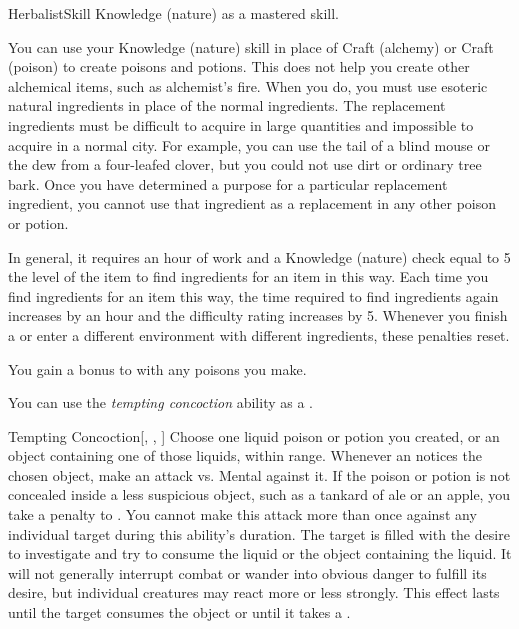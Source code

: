     \begin{feat}{Herbalist}{Skill}
        \featpre Knowledge (nature) as a mastered skill.

         You can use your Knowledge (nature) skill in place of Craft (alchemy) or Craft (poison) to create poisons and potions.
        This does not help you create other alchemical items, such as alchemist's fire.
        When you do, you must use esoteric natural ingredients in place of the normal ingredients.
        The replacement ingredients must be difficult to acquire in large quantities and impossible to acquire in a normal city.
        For example, you can use the tail of a blind mouse or the dew from a four-leafed clover, but you could not use dirt or ordinary tree bark.
        Once you have determined a purpose for a particular replacement ingredient, you cannot use that ingredient as a replacement in any other poison or potion.

        In general, it requires an hour of work and a Knowledge (nature) check equal to 5 \add the level of the item to find ingredients for an item in this way.
        Each time you find ingredients for an item this way, the time required to find ingredients again increases by an hour and the difficulty rating increases by 5.
        Whenever you finish a  or enter a different environment with different ingredients, these penalties reset.

         You gain a  bonus to  with any poisons you make.

         You can use the \textit{tempting concoction} ability as a .
        \begin{attuneability}{Tempting Concoction}[, , ]
            Choose one liquid poison or potion you created, or an object containing one of those liquids, within \rngshort range.
            Whenever an  notices the chosen object, make an attack vs. Mental against it.
            If the poison or potion is not concealed inside a less suspicious object, such as a tankard of ale or an apple, you take a  penalty to .
            You cannot make this attack more than once against any individual target during this ability's duration.
            \hit The target is filled with the desire to investigate and try to consume the liquid or the object containing the liquid.
            It will not generally interrupt combat or wander into obvious danger to fulfill its desire, but individual creatures may react more or less strongly.
            This effect lasts until the target consumes the object or until it takes a .


\end{attuneability}
\end{feat}
